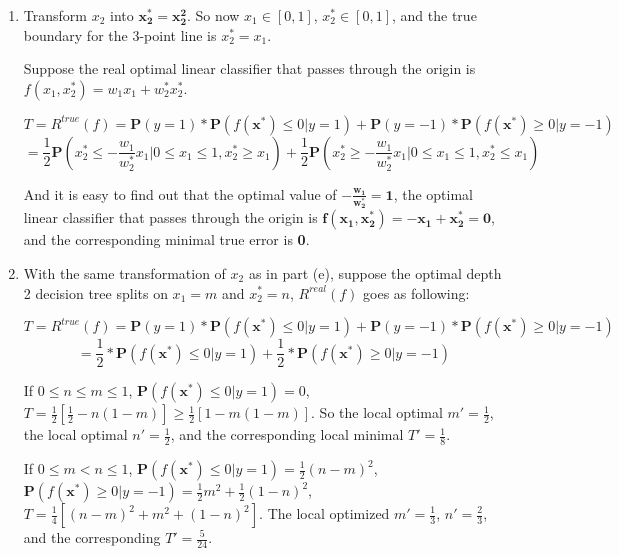 \documentclass[paper=letter, fontsize=12pt]{article}
\begin{document}
\begin{enumerate}[label=(\alph*)]
	\item Transform $x_2$ into $\mathbf{x_2^* = x_2^2}$. So now $x_1 \in [0, 1]$, $x_2^* \in [0, 1]$, and the true boundary for the 3-point line is $x_2^* = x_1$.
	
	Suppose the real optimal linear classifier that passes through the origin is $f(x_1, x_2^*) = w_1 x_1 + w_2^* x_2^*$.
	
	\begin{equation}
	T = R^{true}(f) = \mathbf{P}(y = 1) * \mathbf{P}(f(\mathbf{x^*}) \leq 0 | y = 1) + \mathbf{P}(y = -1) * \mathbf{P}(f(\mathbf{x^*}) \geq 0 | y = -1) 
	\end{equation}
	\begin{equation}
	= \frac{1}{2} \mathbf{P}(x_2^* \leq -\frac{w_1}{w_2^*} x_1 | 0 \leq x_1 \leq 1, x_2^* \geq x_1) + \frac{1}{2} \mathbf{P}(x_2^* \geq -\frac{w_1}{w_2^*} x_1 | 0 \leq x_1 \leq 1, x_2^* \leq x_1) 
	\end{equation}
	
	And it is easy to find out that the optimal value of $\mathbf{-\frac{w_1}{w_2^*} = 1}$, the optimal linear classifier that passes through the origin is $\mathbf{f(x_1, x_2^*) = -x_1 + x_2^* = 0}$, and the corresponding minimal true error is \textbf{0}.
	
	\item With the same transformation of $x_2$ as in part (e), suppose the optimal depth 2 decision tree splits on $x_1 = m$ and $x_2^* = n$, $R^{real}(f)$ goes as following:
	
	\begin{equation}
	T = R^{true}(f) = \mathbf{P}(y = 1) * \mathbf{P}(f(\mathbf{x^*}) \leq 0 | y = 1) + \mathbf{P}(y = -1) * \mathbf{P}(f(\mathbf{x^*}) \geq 0 | y = -1) 
	\end{equation}
	\begin{equation}
	= \frac{1}{2} * \mathbf{P}(f(\mathbf{x^*}) \leq 0 | y = 1) + \frac{1}{2} * \mathbf{P}(f(\mathbf{x^*}) \geq 0 | y = -1) 
	\end{equation}
	
	If $0 \leq n \leq m \leq 1$, $\mathbf{P}(f(\mathbf{x^*}) \leq 0 | y = 1) = 0$, $T = \frac{1}{2} [\frac{1}{2} - n(1-m)] \geq \frac{1}{2}[1-m(1-m)]$. So the local optimal $m' = \frac{1}{2}$, the local optimal $n' = \frac{1}{2}$, and the corresponding local minimal $T' = \frac{1}{8}$.
	
	If $0 \leq m < n \leq 1$, $\mathbf{P}(f(\mathbf{x^*}) \leq 0 | y = 1) = \frac{1}{2} {(n - m)}^2$, $\mathbf{P}(f(\mathbf{x^*}) \geq 0 | y = -1) = \frac{1}{2} m^2 + \frac{1}{2} {(1-n)}^2$, $T = \frac{1}{4}[{(n-m)}^2 + m^2 + {(1-n)}^2]$. The local optimized $m' = \frac{1}{3}$, $n' = \frac{2}{3}$, and the corresponding $T' = \frac{5}{24}$.
	

\end{enumerate}
\end{document}
